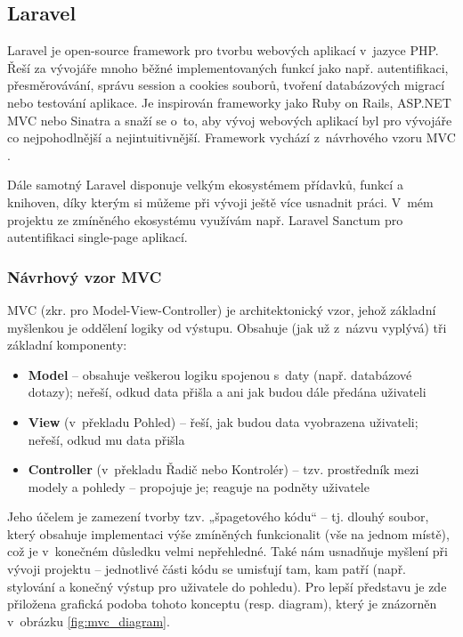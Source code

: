 	\subsection{Laravel}
	Laravel je open-source framework pro tvorbu webových aplikací v~jazyce PHP. Řeší za vývojáře mnoho běžné implementovaných funkcí jako např. autentifikaci, přesměrovávání, správu session a cookies souborů, tvoření databázových migrací nebo testování aplikace. Je inspirován frameworky jako Ruby on Rails, ASP.NET MVC nebo Sinatra a snaží se o~to, aby vývoj webových aplikací byl pro vývojáře co nejpohodlnější a nejintuitivnější. \cite{Laravel1} Framework vychází z~návrhového vzoru MVC \cite{LaravelMVC}.
	
	Dále samotný Laravel disponuje velkým ekosystémem přídavků, funkcí a knihoven, díky kterým si můžeme při vývoji ještě více usnadnit práci. \cite{LaravelEco} V~mém projektu ze zmíněného ekosystému využívám např. Laravel Sanctum pro autentifikaci single-page aplikací.
	
		\subsubsection{Návrhový vzor MVC}
		MVC (zkr. pro Model-View-Controller) je architektonický vzor, jehož základní myšlenkou je oddělení logiky od výstupu. Obsahuje (jak už z~názvu vyplývá) tři základní komponenty:
		
		\begin{itemize}
			\item \textbf{Model} – obsahuje veškerou logiku spojenou s~daty (např. databázové dotazy); neřeší, odkud data přišla a ani jak budou dále předána uživateli
			\item \textbf{View} (v~překladu Pohled) – řeší, jak budou data vyobrazena uživateli; neřeší, odkud mu data přišla
			\item \textbf{Controller} (v~překladu Řadič nebo Kontrolér) – tzv. prostředník mezi modely a pohledy – propojuje je; reaguje na podněty uživatele
		\end{itemize}
	
		Jeho účelem je zamezení tvorby tzv. „špagetového kódu“ – tj. dlouhý soubor, který obsahuje implementaci výše zmíněných funkcionalit (vše na jednom místě), což je v~konečném důsledku velmi nepřehledné. Také nám usnadňuje myšlení při vývoji projektu – jednotlivé části kódu se umisťují tam, kam patří (např. stylování a konečný výstup pro uživatele do pohledu). \cite{MVC} Pro lepší představu je zde přiložena grafická podoba tohoto konceptu (resp. diagram), který je znázorněn v~obrázku \ref{fig:mvc_diagram}.
		
